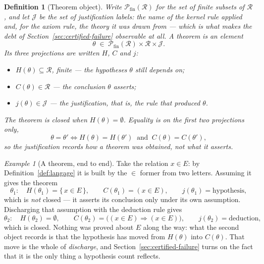 \documentclass[11pt]{article}
\newtheorem{definition}{Definition}
\theoremstyle{remark}\newtheorem{example}{Example}
\begin{document}
\begin{definition}[Theorem object]\label{def:theoreme}
Write $\mathcal{P}_{\mathrm{fin}}(\mathcal{R})$ for the set of finite subsets of
$\mathcal{R}$, and let $\mathcal{J}$ be the set of justification labels: the name of
the kernel rule applied and, for the axiom rule, the theory it was drawn from ---
which is what makes the debt of Section~\ref{sec:certified-failure} observable at all.
A \emph{theorem} is an element
\[ \theta \;\in\; \mathcal{P}_{\mathrm{fin}}(\mathcal{R}) \times
   \mathcal{R} \times \mathcal{J} . \]
Its three projections are written $H$, $C$ and $j$:
\begin{itemize}\itemsep2pt
  \item $H(\theta) \subseteq \mathcal{R}$, finite --- the \emph{hypotheses} $\theta$
        still depends on;
  \item $C(\theta) \in \mathcal{R}$ --- the \emph{conclusion} $\theta$ asserts;
  \item $j(\theta) \in \mathcal{J}$ --- the \emph{justification}, that is, the rule
        that produced $\theta$.
\end{itemize}
The theorem is \emph{closed} when
$H(\theta) = \emptyset$. Equality is on the first two projections only,
\[ \theta = \theta' \iff H(\theta) = H(\theta') \ \text{ and } \ C(\theta) = C(\theta') , \]
so the justification records how a theorem was obtained, not what it asserts.
\end{definition}


\begin{example}[A theorem, end to end]
Take the relation $x \in E$: by Definition~\ref{def:langage} it is built by the
$\in$ former from two letters. Assuming it gives the theorem
\[ \theta_1 : \quad H(\theta_1) = \{\, x \in E \,\}, \qquad
   C(\theta_1) = (x \in E), \qquad j(\theta_1) = \text{hypothesis}, \]
which is \emph{not} closed --- it asserts its conclusion only under its own
assumption. Discharging that assumption with the deduction rule gives
\[ \theta_2 : \quad H(\theta_2) = \emptyset, \qquad
   C(\theta_2) = \bigl((x \in E) \Rightarrow (x \in E)\bigr), \qquad
   j(\theta_2) = \text{deduction}, \]
which is closed. Nothing was proved about $E$ along the way: what the second object
records is that the hypothesis has moved from $H(\theta)$ into $C(\theta)$. That move is the whole of \emph{discharge}, and Section~\ref{sec:certified-failure}
turns on the fact that it is the only thing a hypothesis count reflects.
\end{example}
\end{document}
